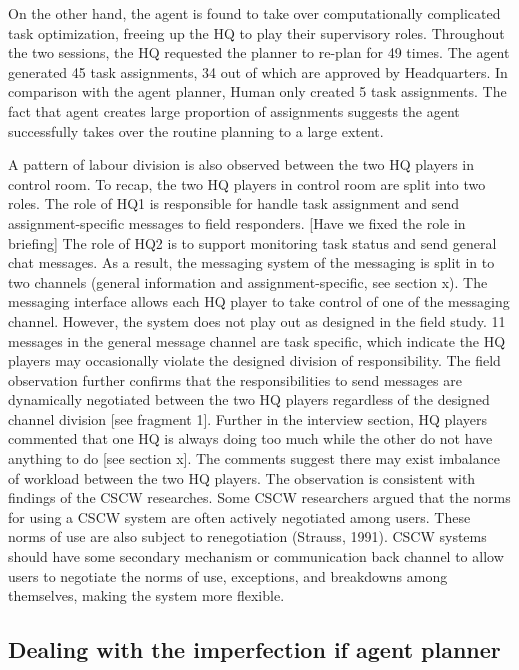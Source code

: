 On the other hand, the agent is found to take over computationally complicated task optimization, freeing up the HQ to play their supervisory roles. Throughout the two sessions, the HQ requested the planner to re-plan for 49 times. The agent generated 45 task assignments, 34 out of which are approved by Headquarters. In comparison with the agent planner, Human only created 5 task assignments. The fact that agent creates large proportion of assignments suggests the agent successfully takes over the routine planning to a large extent. 

A pattern of labour division is also observed between the two HQ players in control room. To recap, the two HQ players in control room are split into two roles. The role of HQ1 is responsible for handle task assignment and send assignment-specific messages to field responders. [Have we fixed the role in briefing] The role of HQ2 is to support monitoring task status and send general chat messages. As a result, the messaging system of the messaging is split in to two channels (general information and assignment-specific, see section x). The messaging interface allows each HQ player to take control of one of the messaging channel.  However, the system does not play out as designed in the field study. 11 messages in the general message channel are task specific, which indicate the HQ players may occasionally violate the designed division of responsibility. The field observation further confirms that the responsibilities to send messages are dynamically negotiated between the two HQ players regardless of the designed channel division [see fragment 1]. Further in the interview section, HQ players commented that one HQ is always doing too much while the other do not have anything to do [see section x]. The comments suggest there may exist imbalance of workload between the two HQ players. The observation is consistent with findings of the CSCW researches. Some CSCW researchers argued that the norms for using a CSCW system are often actively negotiated among users. These norms of use are also subject to renegotiation (Strauss, 1991). CSCW systems should have some secondary mechanism or communication back channel to allow users to negotiate the norms of use, exceptions, and breakdowns among themselves, making the system more flexible.

\subsection{Dealing with the imperfection if agent planner}\label{sec:huilimperfection}

